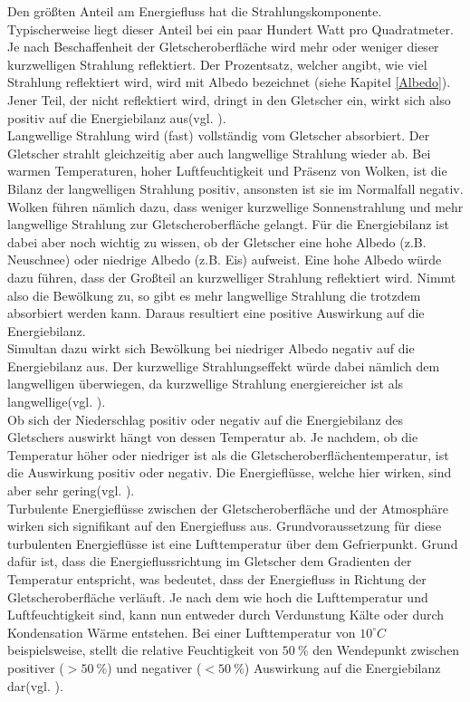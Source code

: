 \documentclass[11pt,a4paper]{article}
\begin{document}
Den größten Anteil am Energiefluss hat die Strahlungskomponente. Typischerweise liegt dieser Anteil bei ein paar Hundert Watt pro Quadratmeter. Je nach Beschaffenheit der Gletscheroberfläche wird mehr oder weniger dieser kurzwelligen Strahlung reflektiert. Der Prozentsatz, welcher angibt, wie viel Strahlung reflektiert wird, wird mit Albedo bezeichnet (siehe Kapitel \ref{Albedo}). Jener Teil, der nicht reflektiert wird, dringt in den Gletscher ein, wirkt sich also positiv auf die Energiebilanz aus(vgl. \cite[16]{Themicroclimateofvalleyglaciers}).\\

Langwellige Strahlung wird (fast) vollständig vom Gletscher absorbiert. Der Gletscher strahlt gleichzeitig aber auch langwellige Strahlung wieder ab. Bei warmen Temperaturen, hoher Luftfeuchtigkeit und Präsenz von Wolken, ist die Bilanz der langwelligen Strahlung positiv, ansonsten ist sie im Normalfall negativ.\\
Wolken führen nämlich dazu, dass weniger kurzwellige Sonnenstrahlung und mehr langwellige Strahlung zur Gletscheroberfläche gelangt. Für die Energiebilanz ist dabei aber noch wichtig zu wissen, ob der Gletscher eine hohe Albedo (z.B. Neuschnee) oder niedrige Albedo (z.B. Eis) aufweist. Eine hohe Albedo würde dazu führen, dass der Großteil an kurzwelliger Strahlung reflektiert wird. Nimmt also die Bewölkung zu, so gibt es mehr langwellige Strahlung die trotzdem absorbiert werden kann. Daraus resultiert eine positive Auswirkung auf die Energiebilanz.\\
Simultan dazu wirkt sich Bewölkung bei niedriger Albedo negativ auf die Energiebilanz aus. Der kurzwellige Strahlungseffekt würde dabei nämlich dem langwelligen überwiegen, da kurzwellige Strahlung energiereicher ist als langwellige(vgl. \cite[16, 17]{Themicroclimateofvalleyglaciers}).\\

Ob sich der Niederschlag positiv oder negativ auf die Energiebilanz des Gletschers auswirkt hängt von dessen Temperatur ab. Je nachdem, ob die Temperatur höher oder niedriger ist als die Gletscheroberflächentemperatur, ist die Auswirkung positiv oder negativ. Die Energieflüsse, welche hier wirken, sind aber sehr gering(vgl. \cite[17]{Themicroclimateofvalleyglaciers}).\\

Turbulente Energieflüsse zwischen der Gletscheroberfläche und der Atmosphäre wirken sich signifikant auf den Energiefluss aus. Grundvoraussetzung für diese turbulenten Energieflüsse ist eine Lufttemperatur über dem Gefrierpunkt. Grund dafür ist, dass die Energieflussrichtung im Gletscher dem Gradienten der Temperatur entspricht, was bedeutet, dass der Energiefluss in Richtung der Gletscheroberfläche verläuft. Je nach dem wie hoch die Lufttemperatur und Luftfeuchtigkeit sind, kann nun entweder durch Verdunstung Kälte oder durch Kondensation Wärme entstehen. Bei einer Lufttemperatur von $10^\circ C$ beispielsweise, stellt die relative Feuchtigkeit von $50~\%$ den Wendepunkt zwischen positiver ($>50~\%$) und negativer ($<50~\%$) Auswirkung auf die Energiebilanz dar(vgl. \cite[17]{Themicroclimateofvalleyglaciers}).\\
\end{document}
